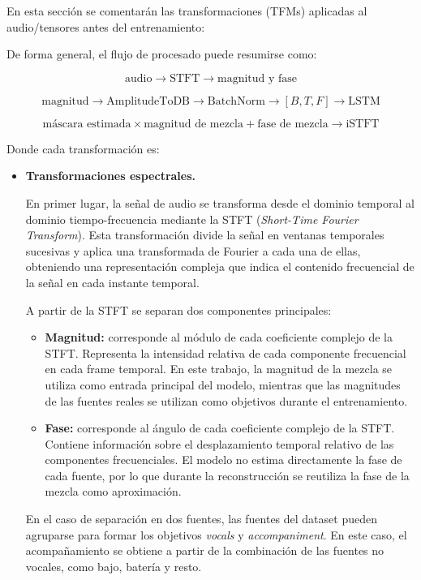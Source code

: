 En esta sección se comentarán las transformaciones (TFMs) aplicadas al audio/tensores antes del entrenamiento:

De forma general, el flujo de procesado puede resumirse como:

\[
\text{audio} \rightarrow \text{STFT} \rightarrow \text{magnitud y fase}
\]

\[
\text{magnitud} \rightarrow \text{AmplitudeToDB} \rightarrow \text{BatchNorm} \rightarrow [B,T,F] \rightarrow \text{LSTM}
\]

\[
\text{máscara estimada} \times \text{magnitud de mezcla} + \text{fase de mezcla} \rightarrow \text{iSTFT}
\]

Donde cada transformación es:

\begin{itemize}

    \item \textbf{Transformaciones espectrales.}

    En primer lugar, la señal de audio se transforma desde el dominio temporal al dominio tiempo-frecuencia mediante la STFT (\textit{Short-Time Fourier Transform}). Esta transformación divide la señal en ventanas temporales sucesivas y aplica una transformada de Fourier a cada una de ellas, obteniendo una representación compleja que indica el contenido frecuencial de la señal en cada instante temporal.

    A partir de la STFT se separan dos componentes principales:

    \begin{itemize}
        \item \textbf{Magnitud:} corresponde al módulo de cada coeficiente complejo de la STFT. Representa la intensidad relativa de cada componente frecuencial en cada frame temporal. En este trabajo, la magnitud de la mezcla se utiliza como entrada principal del modelo, mientras que las magnitudes de las fuentes reales se utilizan como objetivos durante el entrenamiento.

        \item \textbf{Fase:} corresponde al ángulo de cada coeficiente complejo de la STFT. Contiene información sobre el desplazamiento temporal relativo de las componentes frecuenciales. El modelo no estima directamente la fase de cada fuente, por lo que durante la reconstrucción se reutiliza la fase de la mezcla como aproximación.
    \end{itemize}

    En el caso de separación en dos fuentes, las fuentes del dataset pueden agruparse para formar los objetivos \textit{vocals} y \textit{accompaniment}. En este caso, el acompañamiento se obtiene a partir de la combinación de las fuentes no vocales, como bajo, batería y resto.


\end{itemize}
